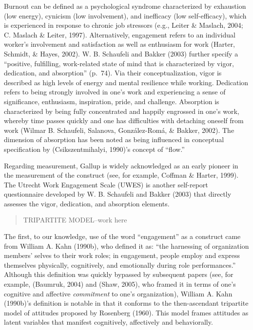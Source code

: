 \documentclass[
  english,
  man]{apa6}
\begin{document}
Burnout can be defined as a psychological syndrome characterized by exhaustion (low energy), cynicism (low involvement), and inefficacy (low self-efficacy), which is experienced in response to chronic job stressors (e.g., Leiter \& Maslach, 2004; C. Maslach \& Leiter, 1997). Alternatively, engagement refers to an individual worker's involvement and satisfaction as well as enthusiasm for work (Harter, Schmidt, \& Hayes, 2002). W. B. Schaufeli and Bakker (2003) further specify a ``positive, fulfilling, work-related state of mind that is characterized by vigor, dedication, and absorption'' (p.~74). Via their conceptualization, vigor is described as high levels of energy and mental resilience while working. Dedication refers to being strongly involved in one's work and experiencing a sense of significance, enthusiasm, inspiration, pride, and challenge. Absorption is characterized by being fully concentrated and happily engrossed in one's work, whereby time passes quickly and one has difficulties with detaching oneself from work (Wilmar B. Schaufeli, Salanova, González-Romá, \& Bakker, 2002). The dimension of absorption has been noted as being influenced in conceptual specification by (Csikszentmihalyi, 1990)'s concept of ``flow.''

Regarding measurement, Gallup is widely acknowledged as an early pioneer in the measurement of the construct (see, for example, Coffman \& Harter, 1999). The Utrecht Work Engagement Scale (UWES) is another self-report questionnaire developed by W. B. Schaufeli and Bakker (2003) that directly assesses the vigor, dedication, and absorption elements.

\begin{quote}
TRIPARTITE MODEL--work here
\end{quote}

The first, to our knowledge, use of the word ``engagement'' as a construct came from William A. Kahn (1990b), who defined it as: ``the harnessing of organization members' selves to their work roles; in engagement, people employ and express themselves physically, cognitively, and emotionally during role performances.'' Although this definition was quickly bypassed by subsequent papers (see, for example, (Baumruk, 2004) and (Shaw, 2005), who framed it in terms of one's cognitive and affective \emph{commitment} to one's organization), William A. Kahn (1990b)'s definition is notable in that it conforms to the then-ascendant tripartite model of attitudes proposed by Rosenberg (1960). This model frames attitudes as latent variables that manifest cognitively, affectively and behaviorally.
\end{document}
